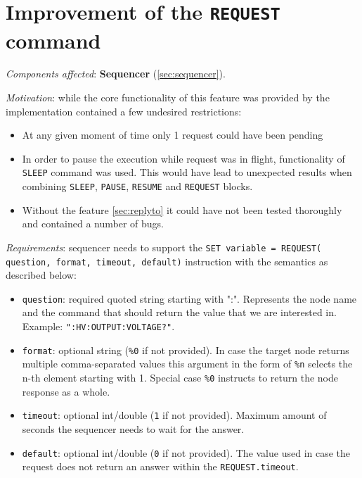 \section{Improvement of the \texttt{REQUEST} command}
\label{sec:request}

\textit{Components affected}: \textbf{Sequencer} (\ref{sec:sequencer}).

\textit{Motivation}: while the core functionality of this feature was provided by \cite{Germann2019} the implementation contained a few undesired restrictions:

\begin{itemize}
	\item At any given moment of time only 1 request could have been pending
	\item In order to pause the execution while request was in flight, functionality of \texttt{SLEEP} command was used. This would have lead to unexpected results when combining \texttt{SLEEP}, \texttt{PAUSE}, \texttt{RESUME} and \texttt{REQUEST} blocks.
	\item Without the feature \ref{sec:replyto} it could have not been tested thoroughly and contained a number of bugs.
\end{itemize}

\textit{Requirements}: sequencer needs to support the \texttt{SET variable = REQUEST( question, format, timeout, default)} instruction with the semantics as described below:

\begin{itemize}
	\item \texttt{question}: required quoted string starting with ":". Represents the node name and the  command that should return the value that we are interested in. Example: \texttt{":HV:OUTPUT:VOLTAGE?"}.
	\item \texttt{format}: optional string (\texttt{\%0} if not provided). In case the target node returns multiple comma-separated values this argument in the form of \texttt{\%n} selects the n-th element starting with 1. Special case \texttt{\%0} instructs to return the node response as a whole.
	\item \texttt{timeout}: optional int/double (\texttt{1} if not provided). Maximum amount of seconds the sequencer needs to wait for the answer.
	\item \texttt{default}: optional int/double (\texttt{0} if not provided). The value used in case the request does not return an answer within the \texttt{REQUEST.timeout}.
\end{itemize}

